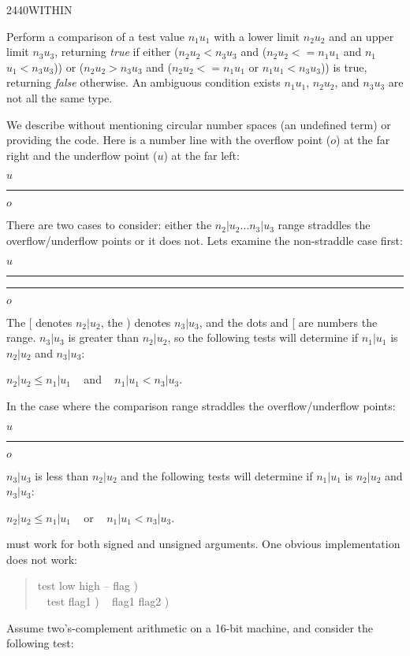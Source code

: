 \begin{newword}{2440}{WITHIN}

	Perform a comparison of a test value $n_1$\textbar$u_1$ with a
	lower limit $n_2$\textbar$u_2$ and an upper limit
	$n_3$\textbar$u_3$, returning \emph{true} if either
	($n_2$\textbar$u_2 <  n_3$\textbar$u_3$ and
	($n_2$\textbar$u_2 <= n_1$\textbar$u_1$ and
	 $n_1$\textbar$u_1 <  n_3$\textbar$u_3$)) or
	($n_2$\textbar$u_2 >  n_3$\textbar$u_3$ and
	($n_2$\textbar$u_2 <= n_1$\textbar$u_1$ or
	 $n_1$\textbar$u_1 <  n_3$\textbar$u_3$)) is true, returning
	\emph{false} otherwise. An ambiguous condition exists
	$n_1$\textbar$u_1$, $n_2$\textbar$u_2$, and
	$n_3$\textbar$u_3$ are not all the same type.

	\begin{rationale} %
		We describe  without mentioning circular number
		spaces (an undefined term) or providing the code. Here is a
		number line with the overflow point ($o$) at the far right and
		the underflow point ($u$) at the far left:
		\begin{center}
			$u$\rule[.5ex]{15em}{.4pt}$o$
		\end{center}
		There are two cases to consider: either the
		$n_2|u_2\ldots n_3|u_3$ range straddles the overflow/underflow
		points or it does not. Lets examine the non-straddle case
		first:
		\begin{center}
			$u$\rule[.5ex]{5em}{.4pt}\makebox[5em]{[\dotfill)}\rule[.5ex]{5em}{.4pt}$o$
		\end{center}
		The [ denotes $n_2|u_2$, the ) denotes $n_3|u_3$, and the dots
		and [ are numbers  the range. $n_3|u_3$ is greater
		than $n_2|u_2$, so the following tests will determine if
		$n_1|u_1$ is  $n_2|u_2$ and $n_3|u_3$:
		\begin{center}
			$n_2|u_2 \le n_1|u_1$ ~ and ~ $n_1|u_1 < n_3|u_3$.
		\end{center}
		In the case where the comparison range straddles the
		overflow/underflow points:
		\begin{center}
			$u$\makebox[5em]{\dotfill)}\rule[.5ex]{5em}{.4pt}\makebox[5em]{[\dotfill}$o$
		\end{center}
		$n_3|u_3$ is less than $n_2|u_2$ and the following tests will
		determine if $n_1|u_1$ is  $n_2|u_2$ and
		$n_3|u_3$:
		\begin{center}
			$n_2|u_2 \le n_1|u_1$ ~ or ~ $n_1|u_1 < n_3|u_3$.
		\end{center}
		 must work for both signed and unsigned arguments.
		One obvious implementation does not work:
		\begin{quote}\ttfamily
			\word{:}   test low high -- flag ) \\
			\tab {} ~     test flag1 )
				~     flag1 flag2 )
				 \\
			\word{;}
		\end{quote}
		Assume two's-complement arithmetic on a 16-bit machine, and
		consider the following test:


\end{rationale}
\end{newword}
